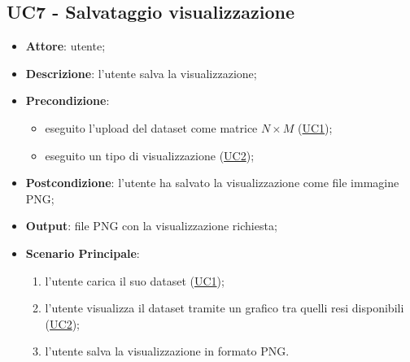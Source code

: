 \subsection{UC7 - Salvataggio visualizzazione}
    \label{uc7}
    \begin{itemize}
    \item \textbf{Attore}: utente;
    \item \textbf{Descrizione}: l'utente salva la visualizzazione;
    \item \textbf{Precondizione}: 
    \begin{itemize}
        \item eseguito l'upload del dataset come matrice $N\times M$ (\hyperref[uc1]{UC1});
        \item eseguito un tipo di visualizzazione (\hyperref[uc2]{UC2});
    \end{itemize}  
    \item \textbf{Postcondizione}: l'utente ha salvato la visualizzazione come file immagine PNG;
    \item \textbf{Output}: file PNG con la visualizzazione richiesta;
    \item \textbf{Scenario Principale}: 
    \begin{enumerate}
        \item l'utente carica il suo dataset (\hyperref[uc1]{UC1});
        \item l'utente visualizza il dataset tramite un grafico tra quelli resi disponibili (\hyperref[uc2]{UC2});
        \item l'utente salva la visualizzazione in formato PNG.
    \end{enumerate}
    \end{itemize}